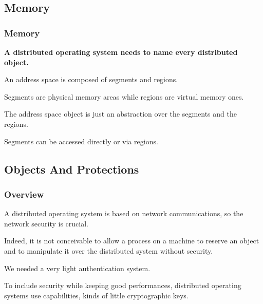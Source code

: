 %
%

\subsection{Memory}


\begin{frame}
  \frametitle{Memory}

  \textbf{A distributed operating system needs to name every
    distributed object.}

  \nl

  An address space is composed of segments and regions.

  \nl

  Segments are physical memory areas while regions are virtual memory
  ones.

  \nl

  The address space object is just an abstraction over the segments and
  the regions.

  \nl

  Segments can be accessed directly or via regions.
\end{frame}

%
%

\subsection{Objects And Protections}


\begin{frame}
  \frametitle{Overview}

  A distributed operating system is based on network communications, so
  the network security is crucial.

  \nl

  Indeed, it is not conceivable to allow a process on a machine
  to reserve an object and to manipulate it over the distributed
  system without security.

  \nl

  We needed a very light authentication system.

  \nl

  To include security while keeping good performances, distributed
  operating systems use capabilities, kinds of little cryptographic keys.
\end{frame}


